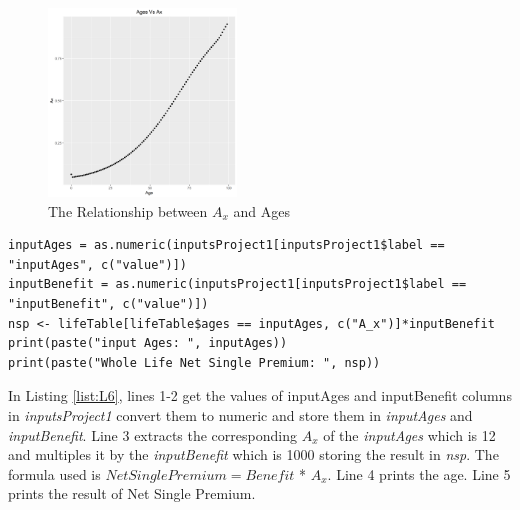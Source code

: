 \documentclass[12pt]{article}
\def\StartLineAtOne{\lstset{firstnumber=1}}
\begin{document}
\begin{figure}[h]
	
	\centering
	\includegraphics[width=0.5\linewidth, height=5cm]{S1.png}
	
	
	\caption{The Relationship between $A_{x}$ and Ages }
	
\end{figure}

\StartLineAtOne
\begin{lstlisting}[caption={ Life Net Single Premium},captionpos=b,label={list:L6}]
inputAges = as.numeric(inputsProject1[inputsProject1$label == "inputAges", c("value")])
inputBenefit = as.numeric(inputsProject1[inputsProject1$label == "inputBenefit", c("value")])
nsp <- lifeTable[lifeTable$ages == inputAges, c("A_x")]*inputBenefit
print(paste("input Ages: ", inputAges))
print(paste("Whole Life Net Single Premium: ", nsp))
\end{lstlisting}
In Listing \ref{list:L6}, lines 1-2 get the values of inputAges and inputBenefit columns in \textit{inputsProject1} convert them to numeric and store them in \textit{inputAges} and \textit{inputBenefit}. Line 3 extracts the corresponding $A_{x}$ of the \textit{inputAges} which is 12 and multiples it by the \textit{inputBenefit} which is 1000 storing the result in \textit{nsp}. The formula used is $Net Single Premium = Benefit$ * $A_{x}$. Line 4 prints the age. Line 5 prints the result of Net Single Premium.
\pagebreak
\end{document}

